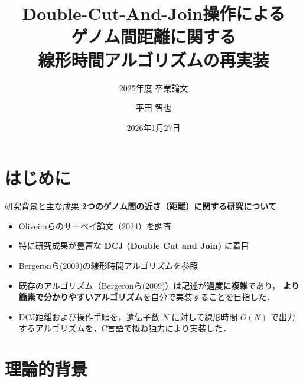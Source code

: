 \documentclass[unicode, 11pt, aspectratio=169]{beamer}
\title[DCJアルゴリズムの再実装]{Double-Cut-And-Join操作による\\ゲノム間距離に関する\\線形時間アルゴリズムの再実装}
\subtitle{2025年度 卒業論文}
\author{平田 智也}
\institute[小田研]{慶應義塾大学 理工学部 数理科学科\\小田研究室}
\date{2026年1月27日}
\begin{document}
\begin{frame}
    \titlepage
\end{frame}

\section{はじめに}
\begin{frame}{研究背景と主な成果}
    \textbf{2つのゲノム間の近さ（距離）に関する研究について}

    \begin{itemize}
        \item Oliveiraらのサーベイ論文（2024）を調査
        \item 特に研究成果が豊富な \textbf{DCJ (Double Cut and Join)} に着目
        \item Bergeronら(2009)の線形時間アルゴリズムを参照
    \end{itemize}

    \vspace{1em}
    \begin{itemize}
        \item 既存のアルゴリズム（Bergeronら(2009)）は記述が\textbf{過度に複雑}であり，
        \textbf{より簡素で分かりやすいアルゴリズム}を自分で実装することを目指した．
    \end{itemize}

    \vspace{1em}
    \begin{itemize}
        \item DCJ距離および操作手順を，遺伝子数 $N$ に対して線形時間 $O(N)$ で出力するアルゴリズムを，C言語で概ね独力により実装した．
    \end{itemize}
\end{frame}

\section{理論的背景}
\end{document}
